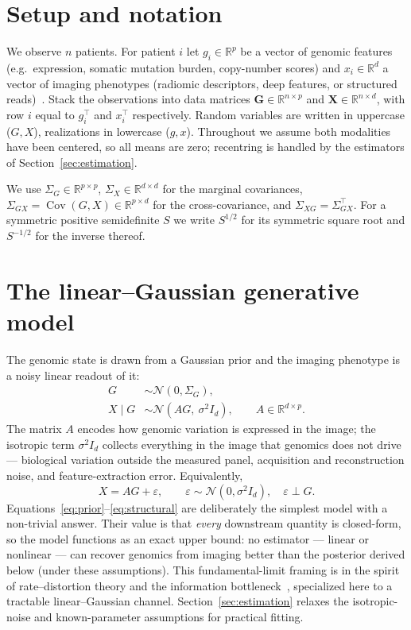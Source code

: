 \documentclass{article}
\newcommand{\R}{\mathbb{R}}
\newcommand{\N}{\mathcal{N}}
\newcommand{\Cov}{\operatorname{Cov}}
\newcommand{\Sg}{\Sigma_{G}}
\newcommand{\Sx}{\Sigma_{X}}
\newcommand{\Sgx}{\Sigma_{GX}}
\newcommand{\Sxg}{\Sigma_{XG}}
\newcommand{\T}{^{\top}}
\begin{document}
\section{Setup and notation}
\label{sec:setup}

We observe $n$ patients. For patient $i$ let $g_i \in \R^{p}$ be a vector of
genomic features (e.g.\ expression, somatic mutation burden, copy-number scores)
and $x_i \in \R^{d}$ a vector of imaging phenotypes (radiomic descriptors, deep
features, or structured reads)~\citep{lambin2012radiomics,gillies2016radiomics,mayerhoefer2020radiomics}. Stack the observations into data matrices
$\mathbf{G} \in \R^{n \times p}$ and $\mathbf{X} \in \R^{n \times d}$, with row
$i$ equal to $g_i\T$ and $x_i\T$ respectively. Random variables are written in
uppercase ($G, X$), realizations in lowercase ($g, x$). Throughout we assume
both modalities have been centered, so all means are zero; recentring is handled
by the estimators of Section~\ref{sec:estimation}.

We use $\Sg \in \R^{p \times p}$, $\Sx \in \R^{d \times d}$ for the marginal
covariances, $\Sgx = \Cov(G, X) \in \R^{p \times d}$ for the cross-covariance,
and $\Sxg = \Sgx\T$. For a symmetric positive semidefinite $S$ we write $S^{1/2}$ for
its symmetric square root and $S^{-1/2}$ for the inverse thereof.

\section{The linear--Gaussian generative model}
\label{sec:model}

The genomic state is drawn from a Gaussian prior and the imaging phenotype is a
noisy linear readout of it:
\begin{align}
G &\sim \N(0, \Sg), \label{eq:prior}\\
X \mid G &\sim \N(A G,\ \sigma^2 I_d), \qquad A \in \R^{d \times p}. \label{eq:likelihood}
\end{align}
The matrix $A$ encodes how genomic variation is expressed in the image; the
isotropic term $\sigma^2 I_d$ collects everything in the image that genomics does
not drive --- biological variation outside the measured panel, acquisition and
reconstruction noise, and feature-extraction error. Equivalently,
\begin{equation}
X = A G + \varepsilon, \qquad \varepsilon \sim \N(0, \sigma^2 I_d), \quad \varepsilon \perp G.
\label{eq:structural}
\end{equation}
Equations~\eqref{eq:prior}--\eqref{eq:structural} are deliberately the simplest
model with a non-trivial answer. Their value is that \emph{every} downstream
quantity is closed-form, so the model functions as an exact upper bound: no
estimator --- linear or nonlinear --- can recover genomics from imaging better
than the posterior derived below (under these assumptions). This fundamental-limit
framing is in the spirit of rate--distortion theory and the information
bottleneck~\citep{shannon1948mathematical,berger1971rate,tishby1999ib,tishby2015deep,chechik2005gaussianib},
specialized here to a tractable linear--Gaussian channel. Section~\ref{sec:estimation} relaxes the
isotropic-noise and known-parameter assumptions for practical fitting.
\end{document}
